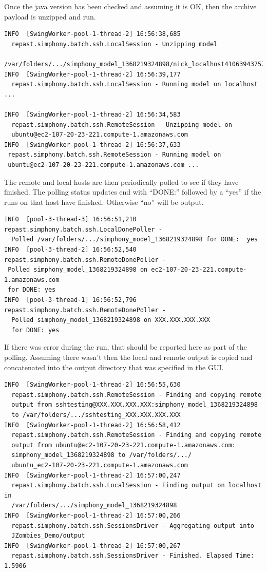 \documentclass[11pt]{amsart}
\begin{document}
Once the java version has been checked and assuming it is OK, then the archive payload is unzipped and run.

\begin{verbatim}
INFO  [SwingWorker-pool-1-thread-2] 16:56:38,685
  repast.simphony.batch.ssh.LocalSession - Unzipping model
  /var/folders/.../simphony_model_1368219324898/nick_localhost4106394375716993975.zip
INFO  [SwingWorker-pool-1-thread-2] 16:56:39,177
  repast.simphony.batch.ssh.LocalSession - Running model on localhost ...

INFO  [SwingWorker-pool-1-thread-2] 16:56:34,583
  repast.simphony.batch.ssh.RemoteSession - Unzipping model on
  ubuntu@ec2-107-20-23-221.compute-1.amazonaws.com
INFO  [SwingWorker-pool-1-thread-2] 16:56:37,633
 repast.simphony.batch.ssh.RemoteSession - Running model on
 ubuntu@ec2-107-20-23-221.compute-1.amazonaws.com ...
\end{verbatim}

The remote and local hosts are then periodically polled to see if they have finished. The polling status updates end with ``DONE:'' followed by a ``yes'' if the runs on that host have finished. Otherwise ``no'' will be output.

\begin{verbatim}
INFO  [pool-3-thread-3] 16:56:51,210 repast.simphony.batch.ssh.LocalDonePoller -
  Polled /var/folders/.../simphony_model_1368219324898 for DONE:  yes
INFO  [pool-3-thread-2] 16:56:52,540 repast.simphony.batch.ssh.RemoteDonePoller -
 Polled simphony_model_1368219324898 on ec2-107-20-23-221.compute-1.amazonaws.com
 for DONE: yes
INFO  [pool-3-thread-1] 16:56:52,796 repast.simphony.batch.ssh.RemoteDonePoller -
  Polled simphony_model_1368219324898 on XXX.XXX.XXX.XXX
  for DONE: yes
\end{verbatim}

If there was error during the run, that should be reported here as part of the polling. Assuming there wasn't then the local and remote output is copied and concatenated into the output directory that was specified in the GUI.

\begin{verbatim}
INFO  [SwingWorker-pool-1-thread-2] 16:56:55,630
  repast.simphony.batch.ssh.RemoteSession - Finding and copying remote
  output from sshtesting@XXX.XXX.XXX.XXX:simphony_model_1368219324898
  to /var/folders/.../sshtesting_XXX.XXX.XXX.XXX
INFO  [SwingWorker-pool-1-thread-2] 16:56:58,412
  repast.simphony.batch.ssh.RemoteSession - Finding and copying remote
  output from ubuntu@ec2-107-20-23-221.compute-1.amazonaws.com:
  simphony_model_1368219324898 to /var/folders/.../
  ubuntu_ec2-107-20-23-221.compute-1.amazonaws.com
INFO  [SwingWorker-pool-1-thread-2] 16:57:00,247
  repast.simphony.batch.ssh.LocalSession - Finding output on localhost in
  /var/folders/.../simphony_model_1368219324898
INFO  [SwingWorker-pool-1-thread-2] 16:57:00,266
  repast.simphony.batch.ssh.SessionsDriver - Aggregating output into
  JZombies_Demo/output
INFO  [SwingWorker-pool-1-thread-2] 16:57:00,267
  repast.simphony.batch.ssh.SessionsDriver - Finished. Elapsed Time: 1.5906
\end{verbatim}
\end{document}
